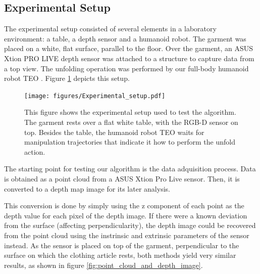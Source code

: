 \subsection{Experimental Setup}
\label{experiments:expermimental_setup}

The experimental setup consisted of several elements in a laboratory environment: a table, a depth sensor and a humanoid robot. The garment was placed on a white, flat surface, parallel to the floor. Over the garment, an ASUS Xtion PRO LIVE depth sensor was attached to a structure to capture data from a top view. The unfolding operation was performed by our full-body humanoid robot TEO \cite{martinez2012teo}. Figure \ref{fig:experimental_setup} depicts this setup.

\begin{figure}[htbp]
    \centering
    \texttt{[image: figures/Experimental\_setup.pdf]}
    \caption[Experimental setup used to test the algorithm]
    {This figure shows the experimental setup used to test the algorithm. The garment rests over a flat white table, with the RGB-D sensor on top. Besides the table, the humanoid robot TEO waits for manipulation trajectories that indicate it how to perform the unfold action.}
    \label{fig:experimental_setup}
\end{figure}

The starting point for testing our algorithm is the data adquisition process. Data is obtained as a point cloud from a ASUS Xtion Pro Live sensor. Then, it is converted to a depth map image for its later analysis. 

This conversion is done by simply using the z component of each point as the depth value for each pixel of the depth image. If there were a known deviation from the surface (affecting perpendicularity), the depth image could be recovered from the point cloud using the instrinsic and extrinsic parameters of the sensor instead. As the sensor is placed on top of the garment, perpendicular to the surface on which the clothing article rests, both methods yield very similar results, as shown in figure \ref{fig:point_cloud_and_depth_image}.

